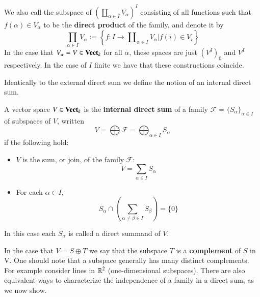 We also call the subspace of $(\amalg_{\alpha \in I}V_{\alpha})^I$ consisting of all functions such that $f(\alpha) \in V_{\alpha}$ to be the \textbf{direct product} of the family, and denote it by \begin{equation*}
    \prod_{\alpha \in I}V_{\alpha} :=\left\{f:I\rightarrow \amalg_{\alpha \in I}V_{\alpha}\Bigg\vert f(i) \in V_i\right\}
\end{equation*}
In the case that $V_{\alpha} = V \in \normalfont\textbf{Vect}_{k}$ for all $\alpha$, these spaces are just $(V^I)_0$ and $V^I$ respectively. In the case of $I$ finite we have that these constructions coincide.

Identically to the external direct sum we define the notion of an internal direct sum.

\begin{definition}
    A vector space $V \in \normalfont\textbf{Vect}_{k}$ is the \textbf{internal direct sum} of a family $\mathcal{F} = \{S_{\alpha}\}_{\alpha \in I}$ of subspaces of $V$, written \begin{equation*}
        V = \bigoplus \mathcal{F} = \bigoplus_{\alpha \in I}S_{\alpha}
    \end{equation*}
    if the following hold: \begin{itemize}
        \item $V$ is the sum, or join, of the family $\mathcal{F}$: \begin{equation*}
                V = \sum_{\alpha \in I}S_{\alpha}
        \end{equation*}
        \item For each $\alpha \in I$, \begin{equation*}
            S_{\alpha}\cap\left(\sum_{\alpha \neq \beta \in I}S_{\beta}\right) = \{0\}
        \end{equation*}
    \end{itemize}
    In this case each $S_{\alpha}$ is called a direct summand of $V$.
\end{definition}

In the case that $V = S\oplus T$ we say that the subspace $T$ is a \textbf{complement} of $S$ in V. One should note that a subspace generally has many distinct complements. For example consider lines in $\mathbb R^2$ (one-dimensional subspaces). There are also equivalent ways to characterize the independence of a family in a direct sum, as we now show.

